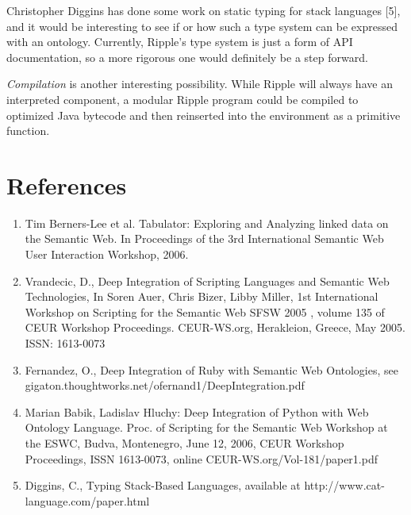 \documentclass[runningheads]{llncs}
\begin{document}
Christopher Diggins has done some work on static typing for stack languages [5], and it would be interesting to see if or how such a type system can be expressed with an ontology.  Currently, Ripple's type system is just a form of API documentation, so a more rigorous one would definitely be a step forward.

\textit{Compilation} is another interesting possibility.  While Ripple will always have an interpreted component, a modular Ripple program could be compiled to optimized Java bytecode and then reinserted into the environment as a primitive function.

\section*{References}
\begin{enumerate}
\item Tim Berners-Lee et al. Tabulator: Exploring and Analyzing linked data on the Semantic Web. In Proceedings of the 3rd International Semantic Web User Interaction Workshop, 2006.
\item Vrandecic, D., Deep Integration of Scripting Languages and Semantic Web Technologies, In Soren Auer, Chris Bizer, Libby Miller, 1st International Workshop on Scripting for the Semantic Web SFSW 2005 , volume 135 of CEUR Workshop Proceedings. CEUR-WS.org, Herakleion, Greece, May 2005. ISSN: 1613-0073
\item Fernandez, O., Deep Integration of Ruby with Semantic Web Ontologies, see gigaton.thoughtworks.net/ofernand1/DeepIntegration.pdf
\item Marian Babik, Ladislav Hluchy: Deep Integration of Python with Web Ontology Language. Proc. of Scripting for the Semantic Web Workshop at the ESWC, Budva, Montenegro, June 12, 2006, CEUR Workshop Proceedings, ISSN 1613-0073, online CEUR-WS.org/Vol-181/paper1.pdf
\item Diggins, C., Typing Stack-Based Languages, available at http://www.cat-language.com/paper.html
\end{enumerate}
\end{document}

